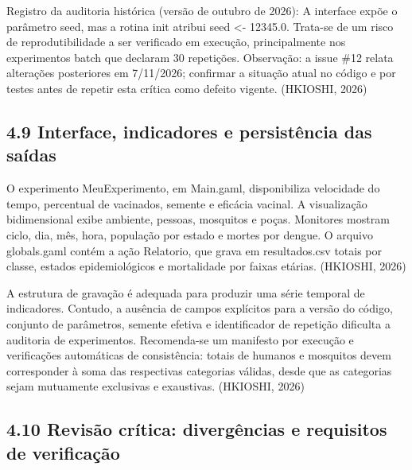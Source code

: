 Registro da auditoria histórica (versão de outubro de 2026): A interface
expõe o parâmetro seed, mas a rotina init atribui seed \textless-
12345.0. Trata-se de um risco de reprodutibilidade a ser verificado em
execução, principalmente nos experimentos batch que declaram 30
repetições. Observação: a issue \#12 relata alterações posteriores em
7/11/2026; confirmar a situação atual no código e por testes antes de
repetir esta crítica como defeito vigente. (HKIOSHI, 2026)

\subsection{4.9 Interface, indicadores e persistência das
saídas}\label{interface-indicadores-e-persistuxeancia-das-sauxeddas}

O experimento MeuExperimento, em Main.gaml, disponibiliza velocidade do
tempo, percentual de vacinados, semente e eficácia vacinal. A
visualização bidimensional exibe ambiente, pessoas, mosquitos e poças.
Monitores mostram ciclo, dia, mês, hora, população por estado e mortes
por dengue. O arquivo globals.gaml contém a ação Relatorio, que grava em
resultados.csv totais por classe, estados epidemiológicos e mortalidade
por faixas etárias. (HKIOSHI, 2026)

A estrutura de gravação é adequada para produzir uma série temporal de
indicadores. Contudo, a ausência de campos explícitos para a versão do
código, conjunto de parâmetros, semente efetiva e identificador de
repetição dificulta a auditoria de experimentos. Recomenda-se um
manifesto por execução e verificações automáticas de consistência:
totais de humanos e mosquitos devem corresponder à soma das respectivas
categorias válidas, desde que as categorias sejam mutuamente exclusivas
e exaustivas. (HKIOSHI, 2026)

\subsection{4.10 Revisão crítica: divergências e requisitos de
verificação}\label{revisuxe3o-cruxedtica-diverguxeancias-e-requisitos-de-verificauxe7uxe3o}

